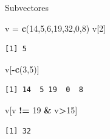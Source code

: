 \documentclass[
  ignorenonframetext,
  aspectratio=169]{beamer}
\newenvironment{Shaded}{\begin{snugshade}}{\end{snugshade}}
\newcommand{\DecValTok}[1]{\textcolor[rgb]{0.00,0.00,0.81}{#1}}
\newcommand{\FunctionTok}[1]{\textcolor[rgb]{0.13,0.29,0.53}{\textbf{#1}}}
\newcommand{\NormalTok}[1]{#1}
\newcommand{\OtherTok}[1]{\textcolor[rgb]{0.56,0.35,0.01}{#1}}
\newcommand{\SpecialCharTok}[1]{\textcolor[rgb]{0.81,0.36,0.00}{\textbf{#1}}}
\begin{document}
\begin{frame}[fragile]{Subvectores}
\label{subvectores-2}
\begin{Shaded}
\begin{Highlighting}[]
\NormalTok{v }\OtherTok{=} \FunctionTok{c}\NormalTok{(}\DecValTok{14}\NormalTok{,}\DecValTok{5}\NormalTok{,}\DecValTok{6}\NormalTok{,}\DecValTok{19}\NormalTok{,}\DecValTok{32}\NormalTok{,}\DecValTok{0}\NormalTok{,}\DecValTok{8}\NormalTok{)}
\NormalTok{v[}\DecValTok{2}\NormalTok{]}
\end{Highlighting}
\end{Shaded}

\begin{verbatim}
[1] 5
\end{verbatim}

\begin{Shaded}
\begin{Highlighting}[]
\NormalTok{v[}\SpecialCharTok{{-}}\FunctionTok{c}\NormalTok{(}\DecValTok{3}\NormalTok{,}\DecValTok{5}\NormalTok{)]}
\end{Highlighting}
\end{Shaded}

\begin{verbatim}
[1] 14  5 19  0  8
\end{verbatim}

\begin{Shaded}
\begin{Highlighting}[]
\NormalTok{v[v }\SpecialCharTok{!=} \DecValTok{19} \SpecialCharTok{\&}\NormalTok{ v}\SpecialCharTok{\textgreater{}}\DecValTok{15}\NormalTok{]}
\end{Highlighting}
\end{Shaded}

\begin{verbatim}
[1] 32
\end{verbatim}
\end{frame}
\end{document}
